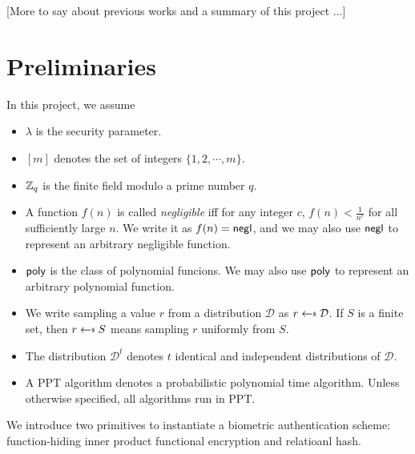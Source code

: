 [More to say about previous works and a summary of this project ...]


\section{Preliminaries}
\label{sec:preliminaries}

In this project, we assume

\begin{itemize}
	
	\item $\lambda$ is the security parameter.

	\item $[m]$ denotes the set of integers $\{1, 2, \cdots, m\}$.

	\item $\mathbb{Z}_q$ is the finite field modulo a prime number $q$.

	\item A function $f(n)$ is called \emph{negligible} iff for any integer $c$, $f(n) < \frac{1}{n^c}$ for all sufficiently large $n$. We write it as $f(n) = \mathsf{negl}$, and we may also use $\mathsf{negl}$ to represent an arbitrary negligible function.
	
	\item $\mathsf{poly}$ is the class of polynomial funcions. We may also use $\mathsf{poly}$ to represent an arbitrary polynomial function.
	
	\item We write sampling a value $r$ from a distribution $\mathcal{D}$ as $r \getsdollar \mathcal{D}$. If $S$ is a finite set, then $r \getsdollar S$ means sampling $r$ uniformly from $S$.

	\item The distribution $\mathcal{D}^t$ denotes $t$ identical and independent distributions of $\mathcal{D}$.

	\item A PPT algorithm denotes a probabilistic polynomial time algorithm. Unless otherwise specified, all algorithms run in PPT.

\end{itemize}


We introduce two primitives to instantiate a biometric authentication scheme: function-hiding inner product functional encryption and relatioanl hash.

